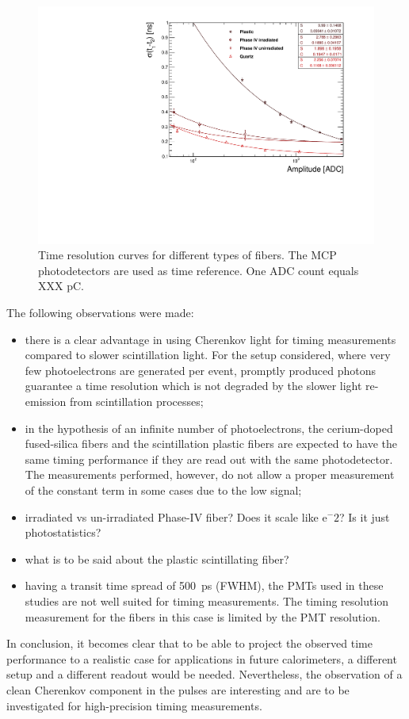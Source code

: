 \documentclass[a4paper,11pt]{article}
\begin{document}
\begin{figure}[ht]
\begin{center}\vspace{-1pc}
      \includegraphics[width=12cm]{Figures/fibres_time_res}
\caption{\small Time resolution curves for different types of fibers. The MCP photodetectors are used as time reference.  One ADC count equals XXX pC.}
    \label{fig:fibres_time_res}
\end{center}
\end{figure}
The following observations were made:
\begin{itemize}
\item there is a clear advantage in using Cherenkov light for timing measurements compared to slower scintillation light. For the setup considered, where very few photoelectrons are generated per event, promptly produced photons guarantee a time resolution which is not degraded by the slower light re-emission from scintillation processes;
\item in the hypothesis of an infinite number of photoelectrons, the cerium-doped fused-silica fibers and the scintillation plastic fibers are expected to have the same timing performance if they are read out with the same photodetector. The measurements performed, however, do not allow a proper measurement of the constant term in some cases due to the low signal;
\item irradiated vs un-irradiated Phase-IV fiber?  Does it scale like e$^-2$?  Is it just photostatistics?
\item what is to be said about the plastic scintillating fiber?
\item having a transit time spread of 500~ps (FWHM), the PMTs used in these studies are not well suited for timing measurements. The timing resolution measurement for the fibers in this case is limited by the PMT resolution.
\end{itemize}
In conclusion, it becomes clear that to be able to project the observed time performance to a realistic case for applications in future calorimeters, a different setup and a different readout would be needed. Nevertheless, the observation of a clean Cherenkov component in the pulses are interesting and are to be investigated for high-precision timing measurements.
\end{document}
